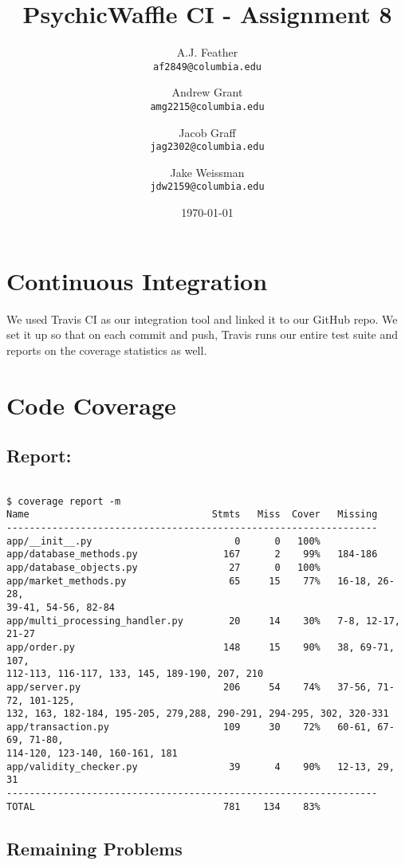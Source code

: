 \documentclass{article}
\author{
    A.J. Feather\\
    \texttt{af2849@columbia.edu}
    \and
    Andrew Grant\\
    \texttt{amg2215@columbia.edu}
    \and
    Jacob Graff\\
    \texttt{jag2302@columbia.edu}
    \and
    Jake Weissman\\
    \texttt{jdw2159@columbia.edu}
}
\date{\today}
\begin{document}
\title{PsychicWaffle CI - Assignment 8}
\maketitle

\section{Continuous Integration}
We used Travis CI as our integration tool and linked it to our GitHub repo. We set it up so that on each commit and push, Travis runs our entire test suite and reports on the coverage statistics as well.

\section{Code Coverage}

\subsection{Report:}

\begin{verbatim}

$ coverage report -m
Name                                Stmts   Miss  Cover   Missing
-----------------------------------------------------------------
app/__init__.py                         0      0   100%
app/database_methods.py               167      2    99%   184-186
app/database_objects.py                27      0   100%
app/market_methods.py                  65     15    77%   16-18, 26-28,
39-41, 54-56, 82-84
app/multi_processing_handler.py        20     14    30%   7-8, 12-17, 21-27
app/order.py                          148     15    90%   38, 69-71, 107,
112-113, 116-117, 133, 145, 189-190, 207, 210
app/server.py                         206     54    74%   37-56, 71-72, 101-125,
132, 163, 182-184, 195-205, 279,288, 290-291, 294-295, 302, 320-331
app/transaction.py                    109     30    72%   60-61, 67-69, 71-80,
114-120, 123-140, 160-161, 181
app/validity_checker.py                39      4    90%   12-13, 29, 31
-----------------------------------------------------------------
TOTAL                                 781    134    83%

\end{verbatim}

\subsection{Remaining Problems}
\end{document}
